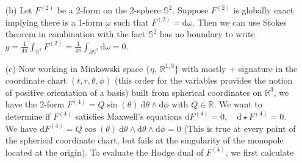 \documentclass[10pt, a4paper]{article}
\begin{document}
{\begin{enumerate}
  \textbf{Counterexample:} Consider the circle smooth manifold $\mathbb{S}^1 \subset \mathbb{R}^2$ (embeded as $\{x^2 + y^2 = 1|(x, y)\in\mathbb{R}^2\}$ for simplicity). It takes at least two charts to cover this manifold and, although on individual charts all closed 1-forms are exact (charts make the manifold look like $\mathbb{R}$ locally), this property is lost globally. Choose the chart map $\theta = \arctan_2$ sending points $(x, y)$ on the circle to their angle with the $x$ axis excluding the point $(1, 0)$ so that the domain is open. With this chart, we have the coordinate induced one form frame field $\text{d}\theta$ which we use to construct the closed form $\omega = \text{d}\theta$. On $(0, 2\pi)$, this form is exact since we have a $0$-form $\lambda =  F \in C^{\infty}((0, 2\pi))$ such that $\omega = \text{d}\lambda = \partial_\theta F \text{d}\theta = \text{d}\theta$ forcing $F = \theta + c$, $c \in \mathbb{R}$ since $F$ has to be a primitive of $1$ in the variable $\theta$. The function $F$ is smooth on the chart, but can never be extended to s smooth function over $\mathbb{S}^1$ globally. Indeed, $0$ and $2\pi$ being identified, a continuous function on $\mathbb{S}^1$ should be consistant at the excluded point $(0, 1)$ and this would requiere  $\lim_{\theta \to 0+} (\theta + c) = \lim_{\theta \to 2\pi^-} (\theta + c)$ which is impossible. Therefore there is a closed form on $\mathbb{S}^1$ that is not exact. 
  \item[(b)] Let $F^{(2)}$ be a 2-form on the 2-sphere $\mathbb{S}^2$. Suppose $F^{(2)}$ is globally exact implying there is a 1-form $\omega$ such that $F^{(2)} = \text{d}\omega$. Then we can use Stokes theorem in combination with the fact $\mathbb{S}^2$ has no boundary to write $g= \frac{1}{4\pi} \int_{\mathbb{S}^2} F^{(2)} = \frac{1}{4\pi} \int_{\partial \mathbb{S}^2} \text{d}\omega = 0$. 
  \item[(c)] Now working in Minkowski space $\{\eta,\ \mathbb{R}^{1, 3}\}$ with mostly $+$ signature in the coordinate chart $(t, r, \theta, \phi)$ (this order for the variables provides the notion of positive orientation of a basis) built from spherical coordinates on $\mathbb{R}^3$, we have the 2-form $F^{(4)} = Q \sin(\theta)\ \text{d}\theta \wedge \text{d}\phi$ with $Q\in \mathbb{R}$. We want to determine if $F^{(4)}$ satisfies Maxwell's equations $\text{d} F^{(4)}=0, \quad \text{d} \star F^{(4)}=0$. We have $\text{d} F^{(4)} =  Q \cos(\theta) \ \text{d}\theta \wedge \text{d}\theta \wedge \text{d}\phi = 0$ (This is true at every point of the spherical coordinate chart, but fails at the singularity of the monopole located at the origin). To evaluate the Hodge dual of $F^{(4)}$, we first calculate 

\end{enumerate}}
\end{document}
